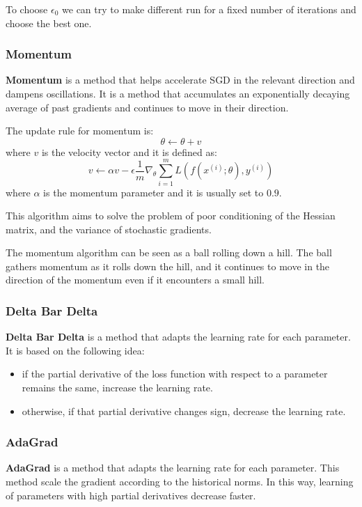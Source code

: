 To choose $\epsilon_0$ we can try to make different run for a fixed number of
iterations and choose the best one.
\subsubsection{Momentum}
\textbf{Momentum} is a method that helps accelerate SGD in the relevant direction
and dampens oscillations. It is a method that accumulates an exponentially decaying
average of past gradients and continues to move in their direction.

The update rule for momentum is:
\begin{equation}
    \theta \gets \theta + v
\end{equation}
where $v$ is the velocity vector and it is defined as:
\begin{equation}
    v \gets \alpha v - \epsilon \frac{1}{m} \nabla_\theta \sum_{i=1}^m L(f(x^{(i)}; \theta), y^{(i)})
\end{equation}
where $\alpha$ is the momentum parameter and it is usually set to $0.9$.

This algorithm aims to solve the problem of poor conditioning of the Hessian
matrix, and the variance of stochastic gradients.

The momentum algorithm can be seen as a ball rolling down a hill. The ball
gathers momentum as it rolls down the hill, and it continues to move in the
direction of the momentum even if it encounters a small hill.
\subsubsection{Delta Bar Delta}
\textbf{Delta Bar Delta} is a method that adapts the learning rate for each
parameter. It is based on the following idea:
\begin{itemize}
    \item if the partial derivative of the loss function with respect to a
          parameter remains the same, increase the learning rate.
    \item otherwise, if that partial derivative changes sign, decrease
          the learning rate.
\end{itemize}
\subsubsection{AdaGrad}
\textbf{AdaGrad} is a method that adapts the learning rate for each parameter.
This method scale the gradient according to the historical norms. In this way,
learning of parameters with high partial derivatives decrease faster.

